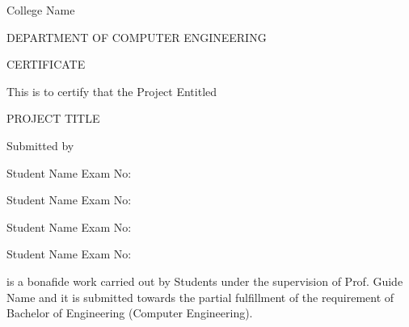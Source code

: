 \documentclass[oneside,a4paper,12pt]{report}
\begin{document}
{\bfseries \fontsize{14}{12} \selectfont \centerline{College Name}
\centerline{DEPARTMENT OF COMPUTER ENGINEERING}
\vspace*{2\baselineskip}} 


{\bfseries \fontsize{16}{12} \selectfont \centerline{CERTIFICATE} 
\vspace*{2\baselineskip}} 

\centerline{This is to certify that the Project Entitled}
\vspace*{.5\baselineskip} 


{\bfseries \fontsize{14}{12} \selectfont \centerline{ PROJECT TITLE}
\vspace*{0.5\baselineskip}}

\centerline{Submitted by}
\vspace*{0.5\baselineskip} 
\centerline{Student Name  \hspace{25 mm} Exam No: } 
\centerline{Student Name \hspace{25 mm} Exam No:  } 
\centerline{Student Name \hspace{25 mm} Exam No: }
\centerline{Student Name \hspace{25 mm} Exam No: }

is a bonafide work carried out by Students under the supervision of Prof. Guide Name and it
is submitted towards the partial fulfillment of the requirement of Bachelor of Engineering (Computer Engineering).\\
\end{document}
